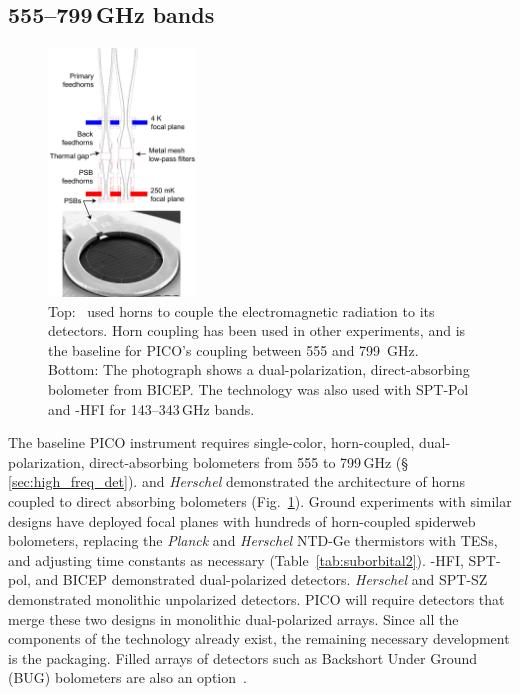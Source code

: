 \subsection{555--799\,GHz bands}
\label{sec:dev_arrays}
%
\begin{figure}  %
\centering
\includegraphics[width=0.35\textwidth]{figures/DirectAbsorbing.png}  %
\vspace{-0.25in}
\caption{\captiontext Top: \planck\ used horns to couple the electromagnetic radiation to its detectors. Horn coupling has been used in other experiments, and is the baseline for PICO's coupling between 555 and 799~GHz. Bottom: The photograph shows a dual-polarization, direct-absorbing bolometer from BICEP. The technology was also used with SPT-Pol and \planck-HFI for 143--343\,GHz bands.
\label{fig:DirectAbsorbing} }
\end{figure}
%

The baseline PICO instrument requires single-color, horn-coupled, dual-polarization, direct-absorbing bolometers from 555 to 799\,GHz (\S\,\ref{sec:high_freq_det}).  \planck and \textit{Herschel} demonstrated the architecture of horns coupled to direct absorbing bolometers (Fig.~\ref{fig:DirectAbsorbing}).    Ground experiments with similar designs have deployed focal planes with hundreds of horn-coupled spiderweb bolometers, replacing the \textit{Planck} and \textit{Herschel} NTD-Ge thermistors with TESs, and adjusting time constants as necessary (Table~\ref{tab:suborbital2}). \planck -HFI, SPT-pol, and BICEP demonstrated dual-polarized detectors. \textit{Herschel} and SPT-SZ demonstrated monolithic unpolarized detectors. PICO will require detectors that merge these two designs in monolithic dual-polarized arrays. Since all the components of the technology already exist, the remaining necessary development is the packaging. Filled arrays of detectors such as Backshort Under Ground (BUG) bolometers are also an option~\citep{Staguhn2006}.

